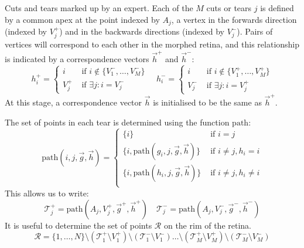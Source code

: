 \documentclass{article}
\begin{document}
Cuts and tears marked up by an expert.  Each of the $M$ cuts or tears
$j$ is defined by a common apex at the point indexed by $A_j$, a
vertex in the forwards direction (indexed by $V^+_j$) and in the
backwards directions (indexed by $V^-_j$).  Pairs of vertices will
correspond to each other in the morphed retina, and this relationship
is indicated by a correspondence vectors $\vec{h}^+$ and $\vec{h}^-$:
\begin{displaymath}
  h^+_i =  \left\{
    \begin{array}{ll}
      i & \mbox{ if } i \not\in \{V^-_1,\dots, V^-_M\} \\
      V^+_j  & \mbox{ if } \exists j: i = V^-_j
    \end{array}\right.
  \quad
  h^-_i =  \left\{
    \begin{array}{ll}
      i & \mbox{ if } i \not\in \{V^+_1,\dots, V^+_M\} \\
      V^-_j  & \mbox{ if } \exists j: i = V^+_j
    \end{array}\right.
\end{displaymath}
At this stage, a correspondence vector $\vec{h}$ is initialised to be
the same as $\vec{h}^+$.

The set of points in each tear is determined using the function
$\mathrm{path}$:
\begin{displaymath}
  \mathrm{path}(i, j, \vec{g}, \vec{h})  = \left\{ 
  \begin{array}{ll}
    \{i\} & \mbox{ if } i = j \\
      \{i, \mathrm{path}(g_i, j, \vec{g}, \vec{h})\} & \mbox{ if } i \ne j, h_i=i \\
      \{i, \mathrm{path}(h_i, j, \vec{g}, \vec{h})\}    & \mbox{ if } i \ne j, h_i\ne i \\
    \end{array}\right.
\end{displaymath}
This allows us to write:
\begin{displaymath}
  \mathcal{T}^+_j  = \mathrm{path}(A_j, V_j^+, \vec{g}^+, \vec{h}^+) \quad 
  \mathcal{T}^-_j  = \mathrm{path}(A_j, V_j^-, \vec{g}^-, \vec{h}^-)
\end{displaymath}
It is useful to determine the set of points $\mathcal{R}$ on the rim
of the retina.
\begin{displaymath}
  \mathcal{R} = \{1,\dots,N\} 
  \setminus (\mathcal{T}^+_1 \setminus V^+_1) 
  \setminus (\mathcal{T}^-_1 \setminus V^-_1)  
  \dots 
  \setminus (\mathcal{T}^+_M \setminus V^+_M)
  \setminus (\mathcal{T}^-_M \setminus V^-_M)
\end{displaymath}
\end{document}
